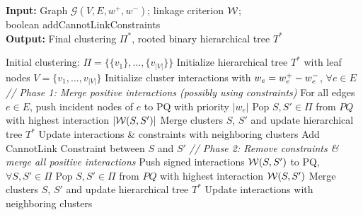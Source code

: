 \begin{algorithm}[t]
\footnotesize
  \begin{flushleft}
  \footnotesize
  \caption{\algname{}}
   \hspace*{\algorithmicindent} \textbf{Input:} Graph $\mathcal{G}(V,E,w^+,w^-)$; linkage criterion $\mathcal{W}{}$; \\ 
   \hspace*{4.3em}boolean {\color{blue}addCannotLinkConstraints}  \\
  \hspace*{\algorithmicindent} \textbf{Output:} Final clustering $\Pi^*$, rooted binary hierarchical tree $T^*$\\
  \hspace*{\algorithmicindent} 
  \begin{algorithmic}[1]
  \footnotesize
      \State Initial clustering: $\Pi=\{\{v_1\}, \ldots, \{v_{|V|}\}\}$
      \State Initialize hierarchical tree $T^*$ with leaf nodes  $V=\{v_1,\ldots,v_{|V|}\}$
      \State Initialize  cluster interactions with $w_e = w^+_e - w^-_e$, $\forall e\in E$
      \State \emph{// Phase 1: Merge positive interactions (possibly using constraints)}
      \State For all edges $e\in E$, push incident nodes of $e$ to PQ with priority $|w_e|$
      \Repeat 
        \State Pop $S,S'\in\Pi$ from $PQ$ with highest interaction $|\mathcal{W}{}(S,S')|$
          \State Merge clusters $S$, $S'$ and update hierarchical tree $T^*$
          \State Update interactions \& constraints with neighboring clusters
          \State Add CannotLink Constraint between $S$ and $S'$
        \EndIf
      \State \emph{// Phase 2: Remove constraints \& merge all positive interactions}
      \State Push signed interactions $\mathcal{W}{}(S,S')$ to PQ, $\forall S, S' \in \Pi$
      \Repeat 
        \State Pop $S,S'\in\Pi$ from $PQ$ with highest interaction $\mathcal{W}{}(S,S')$
          \State Merge clusters $S$, $S'$ and update hierarchical tree $T^*$
          \State Update interactions with neighboring clusters

\end{algorithmic}
\end{flushleft}
\end{algorithm}
